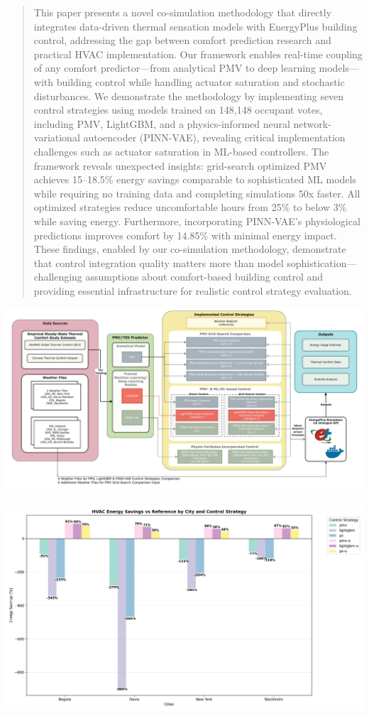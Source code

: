 \documentclass[preprint,12pt]{elsarticle}
\begin{document}
\begin{frontmatter}
\begin{abstract}
This paper presents a novel co-simulation methodology that directly integrates data-driven thermal sensation models with EnergyPlus building control, addressing the gap between comfort prediction research and practical HVAC implementation. Our framework enables real-time coupling of any comfort predictor—from analytical PMV to deep learning models—with building control while handling actuator saturation and stochastic disturbances. 
We demonstrate the methodology by implementing seven control strategies using models trained on 148,148 occupant votes, including PMV, LightGBM, and a physics-informed neural network-variational autoencoder (PINN-VAE), revealing critical implementation challenges such as actuator saturation in ML-based controllers.
The framework reveals unexpected insights: grid-search optimized PMV achieves 15–18.5\% energy savings comparable to sophisticated ML models while requiring no training data and completing simulations 50x faster. All optimized strategies reduce uncomfortable hours from 25\% to below 3\% while saving energy. Furthermore, incorporating PINN-VAE's physiological predictions improves comfort by 14.85\% with minimal energy impact. These findings, enabled by our co-simulation methodology, demonstrate that control integration quality matters more than model sophistication—challenging assumptions about comfort-based building control and providing essential infrastructure for realistic control strategy evaluation.
\end{abstract}
\begin{graphicalabstract}
\centering
\includegraphics[width=.90\linewidth]{figs/gridworkflow_3.pdf}\\
\\
\includegraphics[width=.65\linewidth]{figs/savings_r.png}\\

\end{graphicalabstract}
\end{frontmatter}
\end{document}
